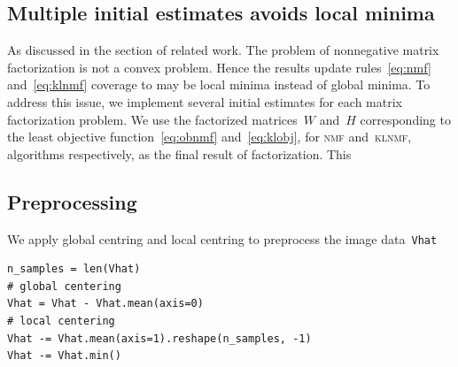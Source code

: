 \subsection{Multiple initial estimates avoids local minima}
As discussed in the section of related work. 
The problem of nonnegative matrix factorization is not a convex problem. 
Hence the results update rules~\eqref{eq:nmf} and~\eqref{eq:klnmf} coverage to may be local minima instead of global minima. 
To address this issue, we implement several initial estimates for each matrix factorization problem. 
We use the factorized matrices~$W$ and~$H$ corresponding to the least objective function~\eqref{eq:obnmf} and~\eqref{eq:klobj}, for \textsc{nmf} and~\textsc{klnmf}, algorithms respectively, as the final result of factorization.
This 

\subsection{Preprocessing}
We apply global centring and local centring to preprocess the image data~\texttt{Vhat}
\begin{lstlisting}[caption=Centring image data, label=matn1]
n_samples = len(Vhat)
# global centering
Vhat = Vhat - Vhat.mean(axis=0)
# local centering
Vhat -= Vhat.mean(axis=1).reshape(n_samples, -1)
Vhat -= Vhat.min()
\end{lstlisting}
